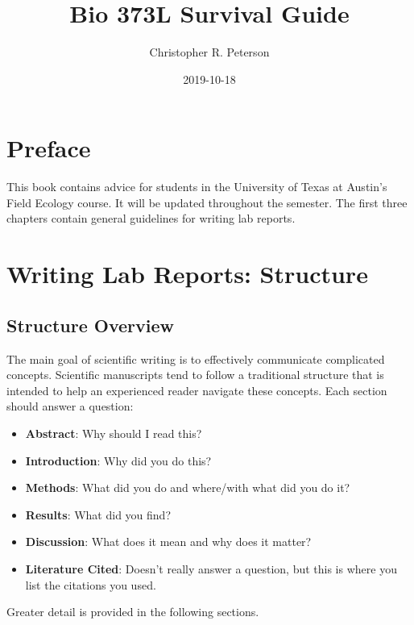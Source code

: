 \documentclass[]{book}
\title{Bio 373L Survival Guide}
\author{Christopher R. Peterson}
\date{2019-10-18}
\providecommand{\tightlist}{%
  \setlength{\itemsep}{0pt}\setlength{\parskip}{0pt}}
\begin{document}
\maketitle

{
\setcounter{tocdepth}{1}
\tableofcontents
}
\chapter*{Preface}\label{preface}

This book contains advice for students in the University of Texas at
Austin's Field Ecology course. It will be updated throughout the
semester. The first three chapters contain general guidelines for
writing lab reports.

\chapter{Writing Lab Reports: Structure}\label{structure}

\section{Structure Overview}\label{structure-overview}

The main goal of scientific writing is to effectively communicate
complicated concepts. Scientific manuscripts tend to follow a
traditional structure that is intended to help an experienced reader
navigate these concepts. Each section should answer a question:

\begin{itemize}
\tightlist
\item
  \textbf{Abstract}: Why should I read this?
\item
  \textbf{Introduction}: Why did you do this?\\
\item
  \textbf{Methods}: What did you do and where/with what did you do it?
\item
  \textbf{Results}: What did you find?\\
\item
  \textbf{Discussion}: What does it mean and why does it matter?
\item
  \textbf{Literature Cited}: Doesn't really answer a question, but this
  is where you list the citations you used.
\end{itemize}

Greater detail is provided in the following sections.
\end{document}
